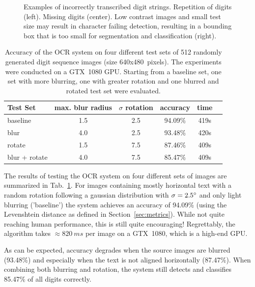 \documentclass[12pt]{article}
\newcommand\secref[1]{Section~\ref{sec:#1}}
\newcommand\tabref[1]{Tab.~\ref{tab:#1}}
\begin{document}
\begin{figure}[t]
{    }
    \caption{
      Examples of incorrectly transcribed digit strings. Repetition of digits (left).
      Missing digits (center). Low contrast images and small test size may result in character failing detection,
      resulting in a bounding box that is too small for segmentation and classification (right).
    }
    \label{fig:bad_examples_pipeline}
\end{figure}


\begin{table}[h!]
\centering
\caption{Accuracy of the OCR system on four different test sets of 512 randomly generated
digit sequence images (size 640x480~pixels). The experiments were conducted on a GTX~1080 GPU.
Starting from a baseline set, one set with more blurring, one with greater rotation and
one blurred and rotated test set were evaluated.}
\label{tab:results_ocr}
\footnotesize
\begin{tabular}{|l|c|c|c|c|c|}
\hline
\rowcolor{lightgray} Test Set & max. blur radius & $\sigma$ rotation & accuracy     & time \\
\hline
baseline       &   1.5            & 2.5               & 94.09\%    &  419s \\
blur           &   4.0            & 2.5               & 93.48\%    &  420s \\
rotate         &   1.5            & 7.5               & 87.46\%    &  409s \\
blur + rotate  &   4.0            & 7.5               & 85.47\%    &  409s \\
\hline
\end{tabular}
\end{table}


The results of testing the OCR system on four different sets of images are summarized in
\tabref{results_ocr}. For images containing mostly horizontal text with a random rotation
following a gaussian distribution with $\sigma = 2.5\degree$ and only light blurring
('baseline') the system achieves an accuracy of 94.09\% (using the Levenshtein distance as
defined in \secref{metrics}). While not quite reaching human performance, this is still
quite encouraging! Regrettably, the algorithm takes $\approx 820~ms$ per image on a
GTX~1080, which is a high-end GPU.

As can be expected, accuracy degrades when the source images are blurred (93.48\%) and
especially when the text is not aligned horizontally (87.47\%). When combining both
blurring and rotation, the system still detects and classifies 85.47\% of all digits
correctly.
\end{document}
